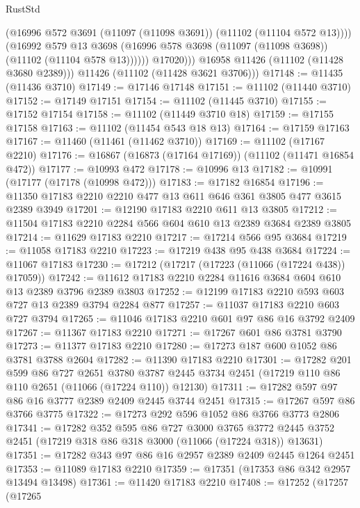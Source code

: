 \begin{lexlean}{RustStd}
\begin{coremodule}
                    (@16996 @572 @3691 (@11097 (@11098 @3691)) (@11102 (@11104 @572 @13))))
                  (@16992
                    @579
                    @13
                    @3698
                    (@16996 @578 @3698 (@11097 (@11098 @3698)) (@11102 (@11104 @578 @13))))))
              @17020)))
        @16958
        @11426
        (@11102 (@11428 @3680 @2389)))
      @11426
      (@11102 (@11428 @3621 @3706)))
@17148 := @11435 (@11436 @3710)
@17149 := @17146 @17148
@17151 := @11102 (@11440 @3710)
@17152 := @17149 @17151
@17154 := @11102 (@11445 @3710)
@17155 := @17152 @17154
@17158 := @11102 (@11449 @3710 @18)
@17159 := @17155 @17158
@17163 := @11102 (@11454 @543 @18 @13)
@17164 := @17159 @17163
@17167 := @11460 (@11461 (@11462 @3710))
@17169 := @11102 (@17167 @2210)
@17176 := @16867 (@16873 (@17164 @17169)) (@11102 (@11471 @16854 @472))
@17177 := @10993 @472
@17178 := @10996 @13
@17182 := @10991 (@17177 (@17178 (@10998 @472)))
@17183 := @17182 @16854
@17196 := @11350 @17183 @2210 @2210 @477 @13 @611 @646 @361 @3805 @477 @3615 @2389 @3949
@17201 := @12190 @17183 @2210 @611 @13 @3805
@17212 := @11504 @17183 @2210 @2284 @566 @604 @610 @13 @2389 @3684 @2389 @3805
@17214 := @11629 @17183 @2210
@17217 := @17214 @566 @95 @3684
@17219 := @11058 @17183 @2210
@17223 := @17219 @438 @95 @438 @3684
@17224 := @11067 @17183
@17230 := @17212 (@17217 (@17223 (@11066 (@17224 @438)) @17059))
@17242 := @11612 @17183 @2210 @2284 @11616 @3684 @604 @610 @13 @2389 @3796 @2389 @3803
@17252 := @12199 @17183 @2210 @593 @603 @727 @13 @2389 @3794 @2284 @877
@17257 := @11037 @17183 @2210 @603 @727 @3794
@17265 := @11046 @17183 @2210 @601 @97 @86 @16 @3792 @2409
@17267 := @11367 @17183 @2210
@17271 := @17267 @601 @86 @3781 @3790
@17273 := @11377 @17183 @2210
@17280 := @17273 @187 @600 @1052 @86 @3781 @3788 @2604
@17282 := @11390 @17183 @2210
@17301 := @17282
    @201
    @599
    @86
    @727
    @2651
    @3780
    @3787
    @2445
    @3734
    @2451
    (@17219 @110 @86 @110 @2651 (@11066 (@17224 @110)) @12130)
@17311 := @17282 @597 @97 @86 @16 @3777 @2389 @2409 @2445 @3744 @2451
@17315 := @17267 @597 @86 @3766 @3775
@17322 := @17273 @292 @596 @1052 @86 @3766 @3773 @2806
@17341 := @17282
    @352
    @595
    @86
    @727
    @3000
    @3765
    @3772
    @2445
    @3752
    @2451
    (@17219 @318 @86 @318 @3000 (@11066 (@17224 @318)) @13631)
@17351 := @17282 @343 @97 @86 @16 @2957 @2389 @2409 @2445 @1264 @2451
@17353 := @11089 @17183 @2210
@17359 := @17351 (@17353 @86 @342 @2957 @13494 @13498)
@17361 := @11420 @17183 @2210
@17408 := @17252
    (@17257
      (@17265

\end{coremodule}
\end{lexlean}

